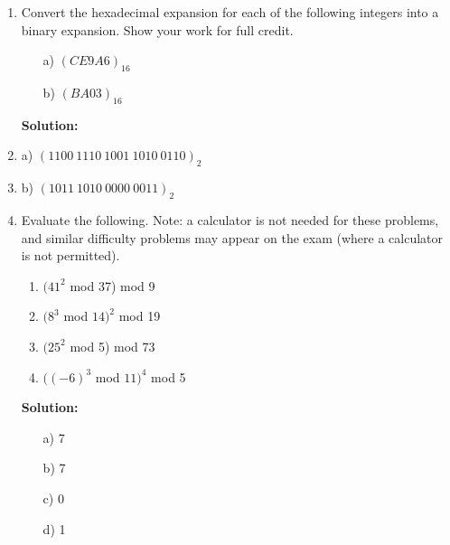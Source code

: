 \documentclass{article}
\newenvironment{solution}
{
\par
\color{blue}
\textbf{Solution:}
}
{
\par
}
\begin{document}
\begin{enumerate}
\item Convert the hexadecimal expansion for each of the following integers into a binary expansion. Show your work for full credit.
\begin{enumerate}
    \item[a)] $(CE9A6)_{16}$
    \item[b)] $(BA03)_{16}$
\end{enumerate}
    \begin{solution}
        \item[a)] $(1100\:1110\:1001\:1010\:0110)_2$
        \item[b)] $(1011\:1010\:0000\:0011)_2$
    \end{solution}

\item Evaluate the following. Note: a calculator is not needed for these problems, and similar difficulty problems
may appear on the exam (where a calculator is not permitted).
\begin{enumerate}
    \item $(41^2$ mod 37) mod 9
    \item $(8^3$ mod $14)^2$ mod 19
    \item $(25^2$ mod 5) mod 73
    \item $((-6)^3$ mod $11)^4$ mod 5
\end{enumerate}
    \begin{solution}
    \begin{enumerate}
        \item[a)] 7
        \item[b)] 7
        \item[c)] 0
        \item[d)] 1
    \end{enumerate}
    \end{solution}



\end{enumerate}
\end{document}
